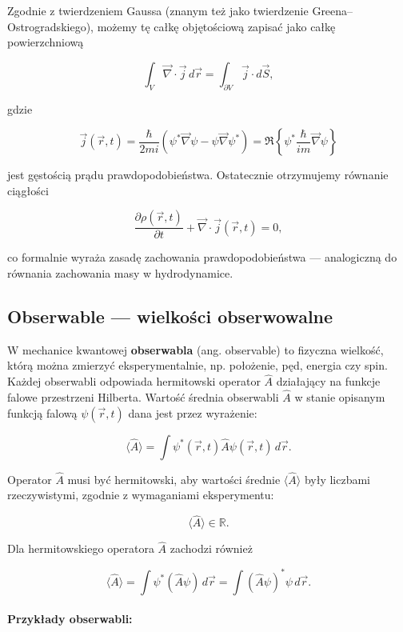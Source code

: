 Zgodnie z twierdzeniem Gaussa (znanym też jako twierdzenie Greena–Ostrogradskiego), możemy tę całkę objętościową zapisać jako całkę powierzchniową

$$
\int_V \vec{\nabla} \cdot \vec{j} \, d\vec{r} = \int_{\partial V} \vec{j} \cdot d\vec{S},
$$

gdzie

$$
\vec{j}(\vec{r}, t) = \frac{\hbar}{2mi} \left( \psi^* \vec{\nabla} \psi - \psi \vec{\nabla} \psi^* \right) = \Re \left\{ \psi^* \frac{\hbar}{im} \vec{\nabla} \psi \right\}
$$

jest gęstością prądu prawdopodobieństwa. Ostatecznie otrzymujemy równanie ciągłości

$$
\frac{\partial \rho(\vec{r}, t)}{\partial t} + \vec{\nabla} \cdot \vec{j}(\vec{r}, t) = 0,
$$

co formalnie wyraża zasadę zachowania prawdopodobieństwa — analogiczną do równania zachowania masy w hydrodynamice.


\subsection{Obserwable — wielkości obserwowalne}

W mechanice kwantowej \textbf{obserwabla} (ang. observable) to fizyczna wielkość, którą można zmierzyć eksperymentalnie, np. położenie, pęd, energia czy spin. Każdej obserwabli odpowiada hermitowski operator $\hat{A}$ działający na funkcje falowe przestrzeni Hilberta. Wartość średnia obserwabli $\hat{A}$ w stanie opisanym funkcją falową $\psi(\vec{r}, t)$ dana jest przez wyrażenie:

$$
\langle \hat{A} \rangle = \int \psi^*(\vec{r}, t) \hat{A} \psi(\vec{r}, t) \, d\vec{r}.
$$

Operator $\hat{A}$ musi być hermitowski, aby wartości średnie $\langle \hat{A} \rangle$ były liczbami rzeczywistymi, zgodnie z wymaganiami eksperymentu:

$$
\langle \hat{A} \rangle \in \mathbb{R}.
$$

Dla hermitowskiego operatora $\hat{A}$ zachodzi również

$$
\langle \hat{A} \rangle = \int \psi^* (\hat{A} \psi) \, d\vec{r} = \int (\hat{A} \psi)^* \psi \, d\vec{r}.
$$

\paragraph{Przykłady obserwabli:}

